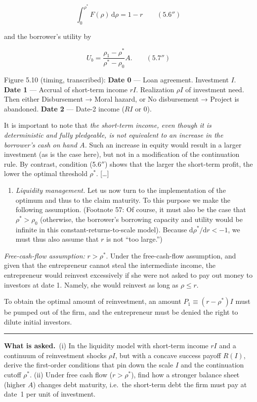 \documentclass[11pt,a4paper]{article}
\newcommand{\asked}{\par\medskip\noindent\textbf{What is asked.}~}
\providecommand{\tightlist}{\setlength{\itemsep}{0pt}\setlength{\parskip}{0pt}}
\newcommand{\stmtend}{\par\endgroup\nopagebreak\noindent\rule{\linewidth}{0.4pt}\par\medskip}
\begin{document}
\[\int_0^{\rho^*}F(\rho)\,\mathrm{d}\rho = 1 - r \qquad (5.6'')\]

and the borrower's utility by

\[U_b = \frac{\rho_1 - \rho^*}{\rho^* - \rho_0}A. \qquad (5.7'')\]

Figure 5.10 (timing, transcribed): \textbf{Date 0} --- Loan agreement. Investment \(I\).
\textbf{Date 1} --- Accrual of short-term income \(rI\). Realization \(\rho I\) of investment need.
Then either Disbursement → Moral hazard, or No disbursement → Project is abandoned. \textbf{Date 2}
--- Date-2 income (\(RI\) or 0).

It is important to note that \emph{the short-term income, even though it is deterministic and fully
pledgeable, is not equivalent to an increase in the borrower's cash on hand \(A\).} Such an increase
in equity would result in a larger investment (as is the case here), but not in a modification of
the continuation rule. By contrast, condition (5.6\(''\)) shows that the larger the short-term
profit, the lower the optimal threshold \(\rho^*\). {[}\ldots{]}

\begin{enumerate}
\def\labelenumi{(\alph{enumi})}
\tightlist
\item
  \emph{Liquidity management.} Let us now turn to the implementation of the optimum and thus to the
  claim maturity. To this purpose we make the following assumption. (Footnote 57: Of course, it must
  also be the case that \(\rho^* > \rho_0\) (otherwise, the borrower's borrowing capacity and
  utility would be infinite in this constant-returns-to-scale model). Because
  \(\mathrm{d}\rho^*/\mathrm{d}r < -1\), we must thus also assume that \(r\) is not ``too large.'')
\end{enumerate}

\emph{Free-cash-flow assumption:} \(r > \rho^*\). Under the free-cash-flow assumption, and given
that the entrepreneur cannot steal the intermediate income, the entrepreneur would reinvest
excessively if she were not asked to pay out money to investors at date 1. Namely, she would
reinvest as long as \(\rho \leqslant r\).

To obtain the optimal amount of reinvestment, an amount \(P_1 \equiv (r - \rho^*)I\) must be pumped
out of the firm, and the entrepreneur must be denied the right to dilute initial investors.
\stmtend

\asked (i) In the liquidity model with short-term income $rI$ and a continuum of reinvestment shocks
$\rho I$, but with a concave success payoff $R(I)$, derive the first-order conditions that pin down the
scale $I$ and the continuation cutoff $\rho^*$. (ii) Under free cash flow ($r>\rho^*$), find how a
stronger balance sheet (higher $A$) changes debt maturity, i.e.\ the short-term debt the firm must pay at
date~1 per unit of investment.
\end{document}
